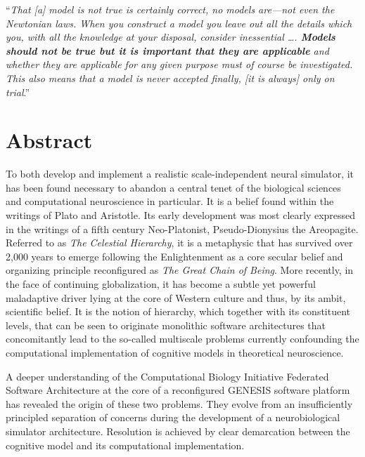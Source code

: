 \documentclass[10pt,letterpaper]{article}
\begin{document}
\vspace*{\baselineskip}
\hspace*{0.025\textwidth}\begin{minipage}{0.8\textwidth}
\noindent ``\small{\textit{That \textnormal{[a]} model is not true is certainly correct, no models are—not even the Newtonian laws. When you construct a model you leave out all the details which you, with all the knowledge at your disposal, consider inessential \ldots. \textbf{Models should not be true but it is important that they are applicable} and whether they are applicable for any given purpose must of course be investigated. This also means that a model is never accepted finally, \textnormal{[it is always]} only on trial}.}''~\cite{rasch80}\\
\end{minipage}

\section*{Abstract}
To both develop and implement a realistic scale-independent neural simulator, it has been found necessary to abandon a central tenet of the biological sciences and computational neuroscience in particular. It is a belief found within the writings of Plato and Aristotle. Its early development was most clearly expressed in the writings of a fifth century Neo-Platonist, Pseudo-Dionysius the Areopagite. Referred to as {\it{The Celestial Hierarchy}}, it is a metaphysic that has survived over 2,000 years to emerge following the Enlightenment as a core secular belief and organizing principle reconfigured as {\it{The Great Chain of Being}}. More recently, in the face of continuing globalization, it has become a subtle yet powerful maladaptive driver lying at the core of Western culture and thus, by its ambit, scientific belief. It is the notion of hierarchy, which together with its constituent levels, that can be seen to originate monolithic software architectures that concomitantly lead to the so-called multiscale problems currently confounding the computational implementation of cognitive models in theoretical neuroscience.

A deeper understanding of the Computational Biology Initiative Federated Software Architecture at the core of a reconfigured GENESIS software platform has revealed the origin of these two problems. They evolve from an insufficiently principled separation of concerns during the development of a neurobiological simulator architecture. Resolution is achieved by clear demarcation between the cognitive model and its computational implementation.
\end{document}
